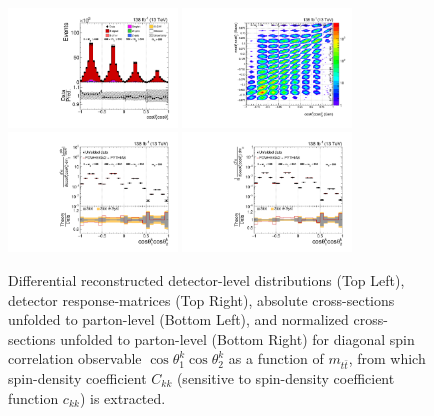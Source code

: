 \clearpage
\begin{figure}[htb]
\begin{center}
 \includegraphics[width=0.40\textwidth]{fig_fullRun2UL/controlplots/combined/Hyp_LLBarCkk_vs_TTBarMass.pdf}
 \includegraphics[width=0.40\textwidth]{fig_fullRun2UL/unfolding/combined/ResponseMatrix_c_kk_mttbar.pdf} \\
 \includegraphics[width=0.40\textwidth]{fig_fullRun2UL/unfolding/combined/UnfoldedResults_c_kk_mttbar.pdf}
 \includegraphics[width=0.40\textwidth]{fig_fullRun2UL/unfolding/combined/UnfoldedResultsNorm_c_kk_mttbar.pdf} \\
\label{fig:c_kk_mttbar}
\caption{Differential reconstructed detector-level distributions (Top Left), detector response-matrices (Top Right), absolute cross-sections unfolded to parton-level (Bottom Left), and normalized cross-sections unfolded to parton-level (Bottom Right) for diagonal spin correlation observable $\cos\theta_{1}^{k}\cos\theta_{2}^{k}$ as a function of $m_{t\bar{t}}$, from which spin-density coefficient $C_{kk}$ (sensitive to spin-density coefficient function $c_{k k}$) is extracted.}
\end{center}
\end{figure}
